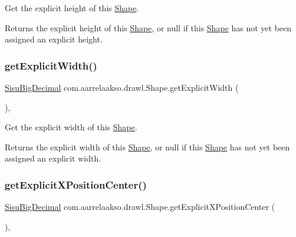 Get the explicit height of this \hyperlink{classcom_1_1aarrelaakso_1_1drawl_1_1_shape}{Shape}.

\begin{DoxyReturn}{Returns}
the explicit height of this \hyperlink{classcom_1_1aarrelaakso_1_1drawl_1_1_shape}{Shape}, or {\ttfamily null} if this \hyperlink{classcom_1_1aarrelaakso_1_1drawl_1_1_shape}{Shape} has not yet been assigned an explicit height. 
\end{DoxyReturn}
\mbox{\label{classcom_1_1aarrelaakso_1_1drawl_1_1_shape_a398f978e0902c270a8f61d6827bcfd8f}} 
\subsubsection{\texorpdfstring{get\+Explicit\+Width()}{getExplicitWidth()}}
{\footnotesize\ttfamily \hyperlink{classcom_1_1aarrelaakso_1_1drawl_1_1_sisu_big_decimal}{Sisu\+Big\+Decimal} com.\+aarrelaakso.\+drawl.\+Shape.\+get\+Explicit\+Width (\begin{DoxyParamCaption}{ }\end{DoxyParamCaption})\hspace{0.3cm}{\ttfamily [protected]}, {\ttfamily [inherited]}}

Get the explicit width of this \hyperlink{classcom_1_1aarrelaakso_1_1drawl_1_1_shape}{Shape}.

\begin{DoxyReturn}{Returns}
the explicit width of this \hyperlink{classcom_1_1aarrelaakso_1_1drawl_1_1_shape}{Shape}, or {\ttfamily null} if this \hyperlink{classcom_1_1aarrelaakso_1_1drawl_1_1_shape}{Shape} has not yet been assigned an explicit width. 
\end{DoxyReturn}
\mbox{\label{classcom_1_1aarrelaakso_1_1drawl_1_1_shape_a079e4ec300c2ab3cd2514230b7428ea4}} 
\subsubsection{\texorpdfstring{get\+Explicit\+X\+Position\+Center()}{getExplicitXPositionCenter()}}
{\footnotesize\ttfamily \hyperlink{classcom_1_1aarrelaakso_1_1drawl_1_1_sisu_big_decimal}{Sisu\+Big\+Decimal} com.\+aarrelaakso.\+drawl.\+Shape.\+get\+Explicit\+X\+Position\+Center (\begin{DoxyParamCaption}{ }\end{DoxyParamCaption})\hspace{0.3cm}{\ttfamily [protected]}, {\ttfamily [inherited]}}

